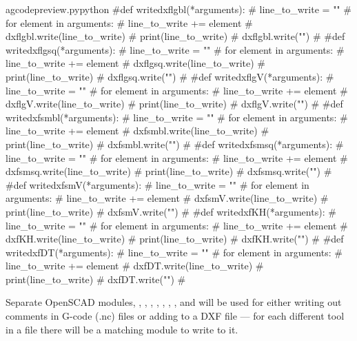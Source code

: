 \documentclass{ltxdoc}
\begin{document}
\lstset{firstnumber=\thegcpy}
\begin{writecode}{a}{gcodepreview.py}{python}
#def writedxflgbl(*arguments):
#    line_to_write = ""
#    for element in arguments:
#        line_to_write += element
#    dxflgbl.write(line_to_write)
#    print(line_to_write)
#    dxflgbl.write("\n")
#
#def writedxflgsq(*arguments):
#    line_to_write = ""
#    for element in arguments:
#        line_to_write += element
#    dxflgsq.write(line_to_write)
#    print(line_to_write)
#    dxflgsq.write("\n")
#
#def writedxflgV(*arguments):
#    line_to_write = ""
#    for element in arguments:
#        line_to_write += element
#    dxflgV.write(line_to_write)
#    print(line_to_write)
#    dxflgV.write("\n")
#
#def writedxfsmbl(*arguments):
#    line_to_write = ""
#    for element in arguments:
#        line_to_write += element
#    dxfsmbl.write(line_to_write)
#    print(line_to_write)
#    dxfsmbl.write("\n")
#
#def writedxfsmsq(*arguments):
#    line_to_write = ""
#    for element in arguments:
#        line_to_write += element
#    dxfsmsq.write(line_to_write)
#    print(line_to_write)
#    dxfsmsq.write("\n")
#
#def writedxfsmV(*arguments):
#    line_to_write = ""
#    for element in arguments:
#        line_to_write += element
#    dxfsmV.write(line_to_write)
#    print(line_to_write)
#    dxfsmV.write("\n")
#
#def writedxfKH(*arguments):
#    line_to_write = ""
#    for element in arguments:
#        line_to_write += element
#    dxfKH.write(line_to_write)
#    print(line_to_write)
#    dxfKH.write("\n")
#
#def writedxfDT(*arguments):
#    line_to_write = ""
#    for element in arguments:
#        line_to_write += element
#    dxfDT.write(line_to_write)
#    print(line_to_write)
#    dxfDT.write("\n")
#
\end{writecode}
\addtocounter{gcpy}{64}
%
 
Separate OpenSCAD modules, 
, 
, 
, 
, 
, 
, 
, and
will be used for either writing out comments in G-code (.nc) files or adding to a DXF file --- for each different tool in a file there will be a matching module to write to it.
 
\end{document}
